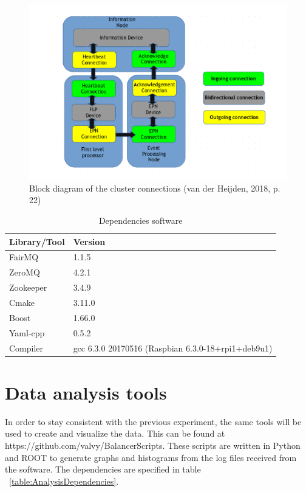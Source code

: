 \begin{figure}[htb]
    \centering
    \includegraphics[scale=0.7]{./graphics/connection_diagram.png}
    \caption{Block diagram of the cluster connections (van der Heijden, 2018, p. 22)}
    \label{fig:SoftwareFigure}
\end{figure}

\begin{table}[htb]
\begin{tabular}{| l | l |}
\hline
Library/Tool & Version \\ \hline
FairMQ & 1.1.5\\ \hline
ZeroMQ & 4.2.1\\ \hline
Zookeeper & 3.4.9 \\ \hline
Cmake & 3.11.0 \\ \hline
Boost & 1.66.0 \\ \hline
Yaml-cpp & 0.5.2 \\ \hline
Compiler & gcc 6.3.0 20170516 (Raspbian 6.3.0-18+rpi1+deb9u1)\\ \hline
\end{tabular}
\caption{Dependencies software}
\label{table:SoftwareDependencies}
\end{table}

\newpage
\newpage

\section{Data analysis tools}
In order to stay consistent with the previous experiment, the same tools will be used to create and visualize the data. This can be found at \\ https://github.com/valvy/BalancerScripts. These scripts are written in Python and ROOT to generate graphs and histograms from the log files received from the software. The dependencies are specified in table ~\ref{table:AnalysisDependencies}.

